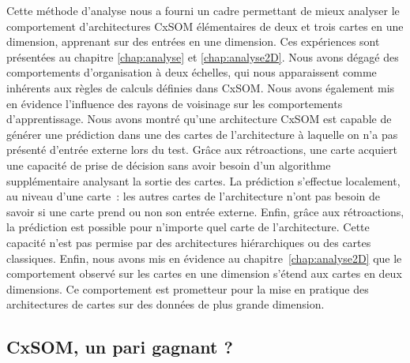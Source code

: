 Cette méthode d'analyse nous a fourni un cadre permettant de mieux analyser le comportement d'architectures CxSOM élémentaires de deux et trois cartes en une dimension, apprenant sur des entrées en une dimension.
Ces expériences sont présentées au chapitre \ref{chap:analyse} et \ref{chap:analyse2D}.
Nous avons dégagé des comportements d'organisation à deux échelles, qui nous apparaissent comme inhérents aux règles de calculs définies dans CxSOM. Nous avons également mis en évidence l'influence des rayons de voisinage sur les comportements d'apprentissage.
Nous avons montré qu'une architecture CxSOM est capable de générer une prédiction dans une des cartes de l'architecture à laquelle on n'a pas présenté d'entrée externe lors du test. 
Grâce aux rétroactions, une carte acquiert une capacité de prise de décision sans avoir besoin d'un algorithme supplémentaire analysant la sortie des cartes. 
La prédiction s'effectue localement, au niveau d'une carte~: les autres cartes de l'architecture n'ont pas besoin de savoir si une carte prend ou non son entrée externe. 
Enfin, grâce aux rétroactions, la prédiction est possible pour n'importe quel carte de l'architecture. Cette capacité n'est pas permise par des architectures hiérarchiques ou des cartes classiques.
Enfin, nous avons mis en évidence au chapitre~\ref{chap:analyse2D} que le comportement observé sur les cartes en une dimension s'étend aux cartes en deux dimensions. Ce comportement est prometteur pour la mise en pratique des architectures de cartes sur des données de plus grande dimension.


\subsection*{CxSOM, un pari gagnant ?}

